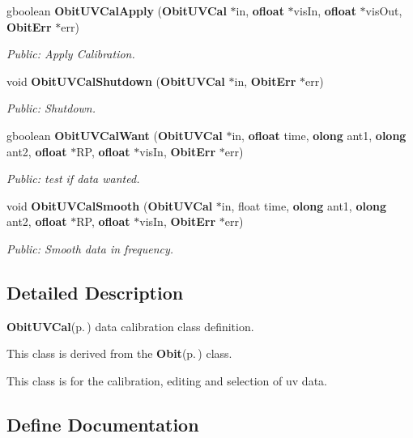 \begin{CompactItemize}
gboolean {\bf Obit\-UVCal\-Apply} ({\bf Obit\-UVCal} $\ast$in, {\bf ofloat} $\ast$vis\-In, {\bf ofloat} $\ast$vis\-Out, {\bf Obit\-Err} $\ast$err)
\begin{CompactList}\small\item\em Public: Apply Calibration. \item\end{CompactList}\item 
void {\bf Obit\-UVCal\-Shutdown} ({\bf Obit\-UVCal} $\ast$in, {\bf Obit\-Err} $\ast$err)
\begin{CompactList}\small\item\em Public: Shutdown. \item\end{CompactList}\item 
gboolean {\bf Obit\-UVCal\-Want} ({\bf Obit\-UVCal} $\ast$in, {\bf ofloat} time, {\bf olong} ant1, {\bf olong} ant2, {\bf ofloat} $\ast$RP, {\bf ofloat} $\ast$vis\-In, {\bf Obit\-Err} $\ast$err)
\begin{CompactList}\small\item\em Public: test if data wanted. \item\end{CompactList}\item 
void {\bf Obit\-UVCal\-Smooth} ({\bf Obit\-UVCal} $\ast$in, float time, {\bf olong} ant1, {\bf olong} ant2, {\bf ofloat} $\ast$RP, {\bf ofloat} $\ast$vis\-In, {\bf Obit\-Err} $\ast$err)
\begin{CompactList}\small\item\em Public: Smooth data in frequency. \item\end{CompactList}\end{CompactItemize}


\subsection{Detailed Description}
{\bf Obit\-UVCal}{\rm (p.\,\pageref{structObitUVCal})} data calibration class definition. 

This class is derived from the {\bf Obit}{\rm (p.\,\pageref{structObit})} class.

This class is for the calibration, editing and selection of uv data.

\subsection{Define Documentation}
